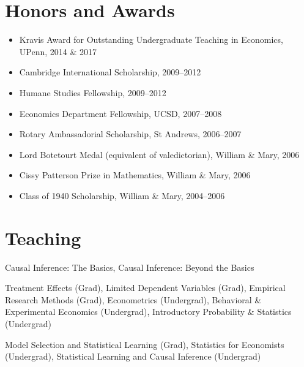 \documentclass[line,overlapped]{myres}
\begin{document}
\begin{resume}
\section{\sc Honors and Awards}
\vspace{1em}
\begin{itemize}
\item Kravis Award for Outstanding Undergraduate Teaching in Economics, UPenn, 2014 \& 2017
\item Cambridge International Scholarship, 2009--2012
\item Humane Studies Fellowship, 2009--2012
\item Economics Department Fellowship, UCSD, 2007--2008
\item Rotary Ambassadorial Scholarship, St Andrews, 2006--2007
\item Lord Botetourt Medal (equivalent of valedictorian), William \& Mary, 2006
\item Cissy Patterson Prize in Mathematics, William \& Mary, 2006
\item Class of 1940 Scholarship, William \& Mary, 2004--2006
\end{itemize}

\section{\sc Teaching }
\begin{description}[style=multiline,leftmargin=3cm,font=\normalfont]
  \item[Short Courses:] Causal Inference: The Basics, Causal Inference: Beyond the Basics
  \item[Oxford:] Treatment Effects (Grad), Limited Dependent Variables (Grad), Empirical Research Methods (Grad), Econometrics (Undergrad), Behavioral \& Experimental Economics (Undergrad), Introductory Probability \& Statistics (Undergrad)
  \item[UPenn:] Model Selection and Statistical Learning (Grad), Statistics for Economists (Undergrad), Statistical Learning and Causal Inference (Undergrad)
\end{description}



\end{resume}
\end{document}
